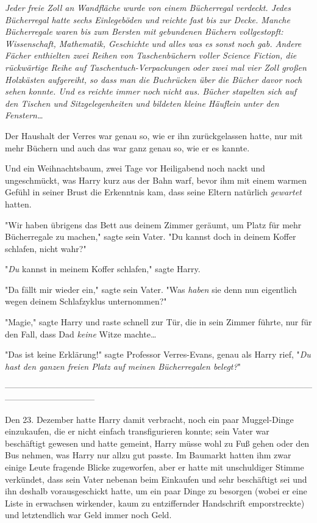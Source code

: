 {\emph{Jeder freie Zoll an Wandfläche wurde von einem Bücherregal verdeckt. Jedes Bücherregal hatte sechs Einlegeböden und reichte fast bis zur Decke. Manche Bücherregale waren bis zum Bersten mit gebundenen Büchern vollgestopft: Wissenschaft, Mathematik, Geschichte und alles was es sonst noch gab. Andere Fächer enthielten zwei Reihen von Taschenbüchern voller Science Fiction, die rückwärtige Reihe auf Taschentuch-Verpackungen oder zwei mal vier Zoll großen Holzkästen aufgereiht, so dass man die Buchrücken über die Bücher davor noch sehen konnte. Und es reichte immer noch nicht aus. Bücher stapelten sich auf den Tischen und Sitzgelegenheiten und bildeten kleine Häuflein unter den Fenstern…}

Der Haushalt der Verres war genau so, wie er ihn zurückgelassen hatte, nur mit mehr Büchern und auch das war ganz genau so, wie er es kannte.

Und ein Weihnachtsbaum, zwei Tage vor Heiligabend noch nackt und ungeschmückt, was Harry kurz aus der Bahn warf, bevor ihm mit einem warmen Gefühl in seiner Brust die Erkenntnis kam, dass seine Eltern natürlich \emph{gewartet} hatten.

"Wir haben übrigens das Bett aus deinem Zimmer geräumt, um Platz für mehr Bücherregale zu machen," sagte sein Vater. "Du kannst doch in deinem Koffer schlafen, nicht wahr?"

"\emph{Du} kannst in meinem Koffer schlafen," sagte Harry.

"Da fällt mir wieder ein," sagte sein Vater. "Was \emph{haben} sie denn nun eigentlich wegen deinem Schlafzyklus unternommen?"

"Magie," sagte Harry und raste schnell zur Tür, die in sein Zimmer führte, nur für den Fall, dass Dad \emph{keine} Witze machte…

"Das ist keine Erklärung!" sagte Professor Verres-Evans, genau als Harry rief, "\emph{Du hast den ganzen freien Platz auf meinen Bücherregalen belegt?}"

--------------------------------------------------------------------------------------------------------------------------------------------

Den 23. Dezember hatte Harry damit verbracht, noch ein paar Muggel-Dinge einzukaufen, die er nicht einfach transfigurieren konnte; sein Vater war beschäftigt gewesen und hatte gemeint, Harry müsse wohl zu Fuß gehen oder den Bus nehmen, was Harry nur allzu gut passte. Im Baumarkt hatten ihm zwar einige Leute fragende Blicke zugeworfen, aber er hatte mit unschuldiger Stimme verkündet, dass sein Vater nebenan beim Einkaufen und sehr beschäftigt sei und ihn deshalb vorausgeschickt hatte, um ein paar Dinge zu besorgen (wobei er eine Liste in erwachsen wirkender, kaum zu entziffernder Handschrift emporstreckte) und letztendlich war Geld immer noch Geld.

}
